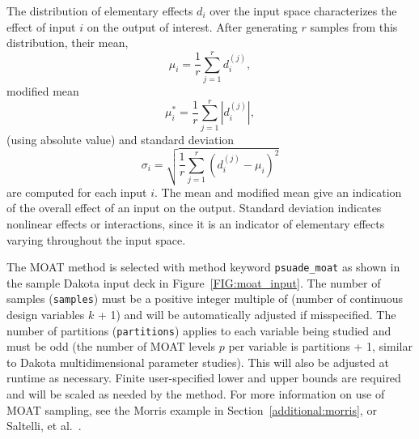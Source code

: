 The distribution of elementary effects $d_i$ over the input space
characterizes the effect of input $i$ on the output of interest.
After generating $r$ samples from this distribution, their mean,
\begin{equation}
\mu_i = \frac{1}{r}\sum_{j=1}^{r}{d_i^{(j)}},
\end{equation}
modified mean
\begin{equation}
\mu_i^* = \frac{1}{r}\sum_{j=1}^{r}{|d_i^{(j)}|},
\end{equation}
(using absolute value) and standard deviation
\begin{equation}
\sigma_i = \sqrt{ \frac{1}{r}\sum_{j=1}^{r}{ \left(d_i^{(j)} - \mu_i
\right)^2} }
\end{equation}
are computed for each input $i$.  The mean and modified mean give an
indication of the overall effect of an input on the output.  Standard
deviation indicates nonlinear effects or interactions, since it is an
indicator of elementary effects varying throughout the input space.

The MOAT method is selected with method keyword {\tt psuade\_moat} as
shown in the sample Dakota input deck in Figure~\ref{FIG:moat_input}.
The number of samples ({\tt samples}) must be a positive integer
multiple of (number of continuous design variables $k$ + 1) and will
be automatically adjusted if misspecified.  The number of partitions
({\tt partitions}) applies to each variable being studied and must be
odd (the number of MOAT levels $p$ per variable is partitions + 1,
similar to Dakota multidimensional parameter studies).  This will also
be adjusted at runtime as necessary.  Finite user-specified lower and
upper bounds are required and will be scaled as needed by the method.
For more information on use of MOAT sampling, see the Morris example
in Section~\ref{additional:morris}, or Saltelli, et al.~\cite{Sal04}.

